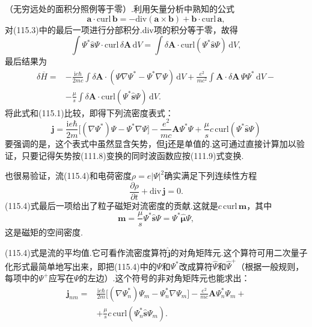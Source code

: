 （无穷远处的面积分照例等于零）.利用矢量分析中熟知的公式
\begin{equation*}
  \boldsymbol{a}\cdot\mathrm{curl}\,\boldsymbol{b}
  =-\mathrm{div}(\boldsymbol{a}\times\boldsymbol{b})
  +\boldsymbol{b}\cdot\mathrm{curl}\,\boldsymbol{a},
\end{equation*}
对(115.3)中的最后一项进行分部积分.div项的积分等于零，故得
\begin{equation*}
  \int\varPsi^{*}\hat{\boldsymbol{s}}\varPsi\cdot\mathrm{curl}\,\delta\boldsymbol{A}\,\mathrm{d}V
  =\int\delta\boldsymbol{A}\cdot\mathrm{curl}(\varPsi^{*}\hat{\boldsymbol{s}}\varPsi)\,\mathrm{d}V,
\end{equation*}
最后结果为
\begin{equation*}
\begin{aligned}
  \delta\overline{H}={}&-\frac{\mathrm{i}e\hbar}{2mc}\int\delta\boldsymbol{A}\cdot
  (\varPsi\nabla\varPsi^{*}-\varPsi^{*}\nabla\varPsi)\,\mathrm{d}V
  +\frac{e^2}{mc^2}\int\boldsymbol{A}\cdot\delta\boldsymbol{A}\,\varPsi\varPsi^{*}\,\mathrm{d}V-\\
  &-\frac{\mu}{s}\int\delta\boldsymbol{A}\cdot\mathrm{curl}(\varPsi^{*}\hat{\boldsymbol{s}}\varPsi)\,\mathrm{d}V.
\end{aligned}
\end{equation*}
将此式和(115.1)比较，即得下列流密度表式：
\begin{equation}
  \boldsymbol{j}=\frac{\mathrm{i}e\hbar}{2m}\bigl[(\nabla\varPsi^{*})\varPsi
  -\varPsi^{*}\nabla\varPsi\bigr]-\frac{e^2}{mc}\boldsymbol{A}\varPsi^{*}\varPsi
  +\frac{\mu}{s}c\,\mathrm{curl}(\varPsi^{*}\hat{\boldsymbol{s}}\varPsi)
\end{equation}
要强调的是，这个表式中虽然显含矢势，但$\boldsymbol{j}$还是单值的.这可通过直接计算加以验证，只要记得矢势按(111.8)变换的同时波函数应按(111.9)式变换.

也很易验证，流(115.4)和电荷密度$\rho=e|\varPsi|^2$确实满足下列连续性方程
\begin{equation*}
  \frac{\partial\rho}{\partial t}+\mathrm{div}\,\boldsymbol{j}=0.
\end{equation*}
(115.4)式最后一项给出了粒子磁矩对流密度的贡献.这就是$c\,\mathrm{curl}\,\boldsymbol{m}$，其中
\begin{equation}
  \boldsymbol{m}=\frac{\mu}{s}\varPsi^{*}\hat{\boldsymbol{s}}\varPsi
  =\varPsi^{*}\hat{\boldsymbol{\mu}}\varPsi,
\end{equation}
这是磁矩的空间密度.

(115.4)式是流的平均值.它可看作流密度算符$\hat{\boldsymbol{j}}$的对角矩阵元.这个算符可用二次量子化形式最简单地写出来，即把(115.4)中的$\varPsi$和$\varPsi^{*}$改成算符$\hat{\varPsi}$和$\hat{\varPsi}^{+}$（根据一般规则，每项中的$\varPsi^{+}$应写在$\varPsi$的左边）.这个符号的非对角矩阵元也能求出：
\begin{equation}
\begin{aligned}
  \boldsymbol{j}_{nm}={}&\frac{\mathrm{i}e\hbar}{2m}
  \bigl[(\nabla\varPsi_n^{*})\varPsi_m-\varPsi_n^{*}\nabla\varPsi_m\bigr]
  -\frac{e^2}{mc}\boldsymbol{A}\varPsi_n^{*}\varPsi_m+\\
  &+\frac{\mu}{s}c\,\mathrm{curl}(\varPsi_n^{*}\hat{\boldsymbol{s}}\varPsi_m).
\end{aligned}
\end{equation}
